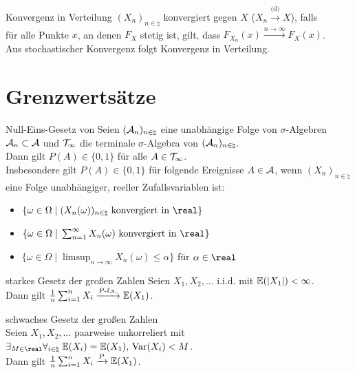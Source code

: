 \begin{Def}{Konvergenz in Verteilung}
    $(X_n)_{n \in \natural}$ konvergiert  gegen $X$
    ($X_n \xrightarrow{\text{(d)}} X$), falls\\
    für alle Punkte $x$, an denen $F_X$ stetig ist, gilt, dass
    $F_{X_n}(x) \xrightarrow{n \to \infty} F_X(x)$.\\
    Aus stochastischer Konvergenz folgt Konvergenz in Verteilung.
\end{Def}

\pagebreak

\section{%
    Grenzwertsätze%
}

\begin{Def}{Null-Eins-Gesetz von }
    Seien $(\mathcal{A}_n)_{n \in \natural}$ eine unabhängige Folge von $\sigma$-Algebren $\mathcal{A}_n \subset \mathcal{A}$
    und $\mathcal{T}_\infty$ die terminale $\sigma$-Algebra von $(\mathcal{A}_n)_{n \in \natural}$.\\
    Dann gilt $P(A) \in \{0, 1\}$ für alle $A \in \mathcal{T}_\infty$.\\
    Insbesondere gilt $P(A) \in \{0, 1\}$ für folgende Ereignisse $A \in \mathcal{A}$,
    wenn $(X_n)_{n \in \natural}$ eine Folge unabhängiger, reeller Zufallsvariablen ist:
    \begin{itemize}
        \item
        $\{\omega \in \Omega \;|\; (X_n(\omega))_{n \in \natural} \text{ konvergiert in } \real\}$

        \item
        $\{\omega \in \Omega \;|\; \sum_{n=1}^\infty X_n(\omega) \text{ konvergiert in } \real\}$

        \item
        $\{\omega \in \Omega \;|\; \limsup_{n \to \infty} X_n(\omega) \le \alpha\}$
        für $\alpha \in \real$
    \end{itemize}
\end{Def}

\begin{Def}{starkes Gesetz der großen Zahlen}
    Seien $X_1, X_2, \dotsc$ i.i.d. mit $\mathbb{E}(|X_1|) < \infty$.\\
    Dann gilt $\frac{1}{n} \sum_{i=1}^n X_i \xrightarrow{P\text{-f.s.}} \mathbb{E}(X_1)$.
\end{Def}

\begin{Def}{schwaches Gesetz der großen Zahlen}\\
    Seien $X_1, X_2, \dotsc$ paarweise unkorreliert mit
    $\exists_{M \in \real} \forall_{i \in \natural}\;
    \EE(X_i) = \EE(X_1),\, \Var(X_i) < M$.\\
    Dann gilt $\frac{1}{n} \sum_{i=1}^n X_i \xrightarrow{P} \mathbb{E}(X_1)$.
\end{Def}

